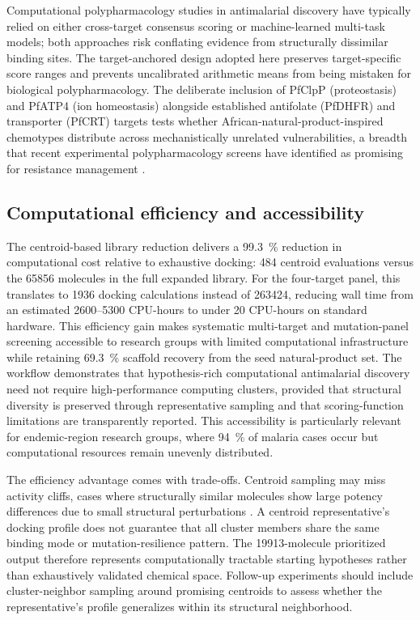 \documentclass[journal=jcisd8,manuscript=article]{achemso}
\begin{document}
Computational polypharmacology studies in antimalarial discovery have typically relied on either cross-target consensus scoring or machine-learned multi-task models; both approaches risk conflating evidence from structurally dissimilar binding sites. The target-anchored design adopted here preserves target-specific score ranges and prevents uncalibrated arithmetic means from being mistaken for biological polypharmacology. The deliberate inclusion of PfClpP (proteostasis) and PfATP4 (ion homeostasis) alongside established antifolate (PfDHFR) and transporter (PfCRT) targets tests whether African-natural-product-inspired chemotypes distribute across mechanistically unrelated vulnerabilities, a breadth that recent experimental polypharmacology screens have identified as promising for resistance management \cite{Wells2015,SiqueiraNeto2023,Blake2025Resistome}.

\subsection{Computational efficiency and accessibility}
The centroid-based library reduction delivers a \qty{99.3}{\percent} reduction in computational cost relative to exhaustive docking: \num{484} centroid evaluations versus the \num{65856} molecules in the full expanded library. For the four-target panel, this translates to \num{1936} docking calculations instead of \num{263424}, reducing wall time from an estimated \numrange{2600}{5300} CPU-hours to under \num{20} CPU-hours on standard hardware. This efficiency gain makes systematic multi-target and mutation-panel screening accessible to research groups with limited computational infrastructure while retaining \qty{69.3}{\percent} scaffold recovery from the seed natural-product set. The workflow demonstrates that hypothesis-rich computational antimalarial discovery need not require high-performance computing clusters, provided that structural diversity is preserved through representative sampling and that scoring-function limitations are transparently reported. This accessibility is particularly relevant for endemic-region research groups, where \qty{94}{\percent} of malaria cases occur \cite{WHO2024MalariaReport} but computational resources remain unevenly distributed.

The efficiency advantage comes with trade-offs. Centroid sampling may miss activity cliffs, cases where structurally similar molecules show large potency differences due to small structural perturbations \cite{Stumpfe2012}. A centroid representative's docking profile does not guarantee that all cluster members share the same binding mode or mutation-resilience pattern. The \num{19913}-molecule prioritized output therefore represents computationally tractable starting hypotheses rather than exhaustively validated chemical space. Follow-up experiments should include cluster-neighbor sampling around promising centroids to assess whether the representative's profile generalizes within its structural neighborhood.
\end{document}
